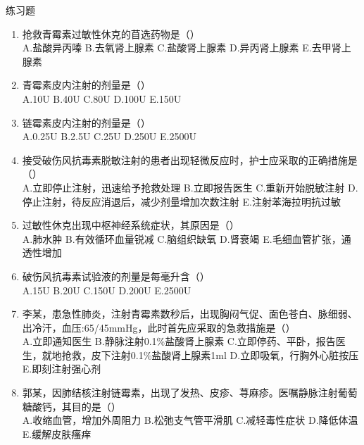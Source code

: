 \documentclass[11pt, a4paper]{ctexart}
\begin{document}
\begin{examplebox}{练习题}
	\begin{enumerate}
		\item 抢救青霉素过敏性休克的苜选药物是（\qquad）\\
		      A.盐酸异丙嗪 \quad B.去氧肾上腺素 \quad C.盐酸肾上腺素 \quad D.异丙肾上腺素 \quad E.去甲肾上腺素
		\item 青霉素皮内注射的剂量是（\qquad）\\
		      A.10U \quad B.40U \quad C.80U \quad D.100U \quad E.150U
		\item 链霉素皮内注射的剂量是（\qquad）\\
		      A.0.25U \quad B.2.5U \quad C.25U \quad D.250U \quad E.2500U
		\item 接受破伤风抗毒素脱敏注射的患者出现轻微反应时，护士应采取的正确措施是（\qquad）\\
		      A.立即停止注射，迅速给予抢救处理 \quad B.立即报告医生 \quad C.重新开始脱敏注射 \quad D.停止注射，待反应消退后，减少剂量增加次数注射 \quad E.注射苯海拉明抗过敏
		\item 过敏性休克出现中枢神经系统症状，其原因是（\qquad）\\
		      A.肺水肿 \quad B.有效循环血量锐减 \quad C.脑组织缺氧 \quad D.肾衰竭 \quad E.毛细血管扩张，通透性增加
		\item 破伤风抗毒素试验液的剂量是每毫升含（\qquad）\\
		      A.15U \quad B.20U \quad C.150U \quad D.200U \quad E.2500U
		\item 李某，患急性肺炎，注射青霉素数秒后，出现胸闷气促、面色苍白、脉细弱、出冷汗，血压:65/45mmHg，此时首先应采取的急救措施是（\qquad）\\
		      A.立即通知医生 \quad B.静脉注射0.1\%盐酸肾上腺素 \quad C.立即停药、平卧，报告医生，就地抢救，皮下注射0.1\%盐酸肾上腺素1ml \quad D.立即吸氧，行胸外心脏按压 \quad E.即刻注射强心剂
		\item 郭某，因肺结核注射链霉素，出现了发热、皮疹、荨麻疹。医嘱静脉注射葡萄糖酸钙，其目的是（\qquad）\\
		      A.收缩血管，增加外周阻力 \quad B.松弛支气管平滑肌 \quad C.减轻毒性症状 \quad D.降低体温 \quad E.缓解皮肤瘙痒
	\end{enumerate}
\end{examplebox}
\end{document}
